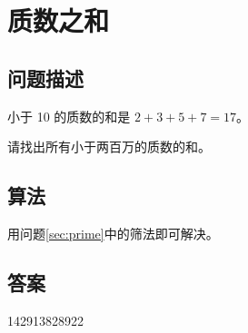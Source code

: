 \section{质数之和}
\subsection{问题描述}
\begin{tcolorbox}
小于 10 的质数的和是 \(2 + 3 + 5 + 7 = 17\)。

请找出所有小于两百万的质数的和。
\end{tcolorbox}

\subsection{算法}
用问题\ref{sec:prime}中的筛法即可解决。

\subsection{答案}
142913828922
